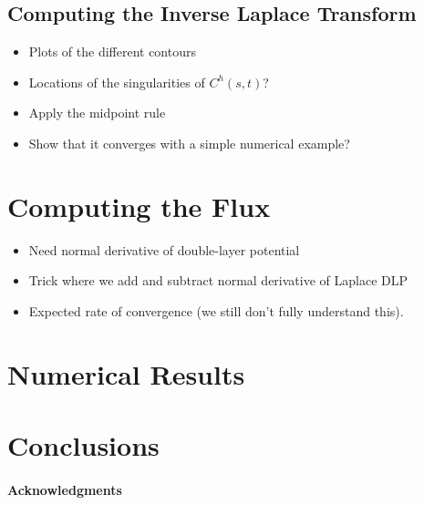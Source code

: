 \documentclass[preprint, 10pt]{elsarticle}
\begin{document}
\subsection{Computing the Inverse Laplace Transform} 
\label{sec:talbot}
\begin{itemize}
  \item Plots of the different contours
  \item Locations of the singularities of $C^h(s,t)$?
  \item Apply the midpoint rule
  \item Show that it converges with a simple numerical example?
\end{itemize}


\section{Computing the Flux}
\label{sec:flux}
\begin{itemize}
  \item Need normal derivative of double-layer potential
  \item Trick where we add and subtract normal derivative of Laplace DLP
  \item Expected rate of convergence (we still don't fully understand
    this).
\end{itemize}






\section{Numerical Results}


\section{Conclusions\label{s:conclusions}}

\paragraph{\bf Acknowledgments} 

 


\end{document}
